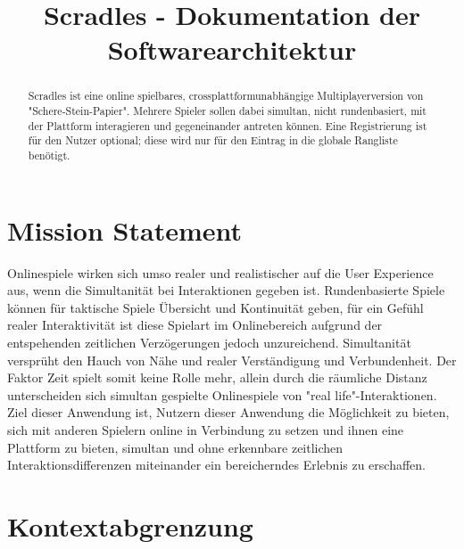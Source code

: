 \documentclass[conference]{IEEEtran}
\title{
Scradles - Dokumentation der Softwarearchitektur
}
\author{\IEEEauthorblockN{Aaron Kreuzer}
\IEEEauthorblockA{
a.kreuzer@oth-aw.de}
\and
\IEEEauthorblockN{Amos Asmerom}
\IEEEauthorblockA{
a.asmerom@oth-aw.de}
\and
\IEEEauthorblockN{Christoph Boni}
\IEEEauthorblockA{
c.boni@oth-aw.de}
\and
\IEEEauthorblockN{Leonard Wöllmer}
\IEEEauthorblockA{
l.woellmer@oth-aw.de}
\and
\IEEEauthorblockN{ Adrian Rall}
\IEEEauthorblockA{
a.rall@oth-aw.de}
\and
\IEEEauthorblockN{ Tahata Djoumsi}
\IEEEauthorblockA{
d.tahata@oth-aw.de}
}
\begin{document}
\maketitle
\thispagestyle{empty}
\pagestyle{empty}


\begin{abstract}

Scradles ist eine online spielbares, crossplattformunabhängige Multiplayerversion von "Schere-Stein-Papier". Mehrere Spieler sollen dabei simultan, nicht rundenbasiert, mit der Plattform interagieren und gegeneinander antreten können. Eine Registrierung ist für den Nutzer optional; diese wird nur für den Eintrag in die globale Rangliste benötigt.

\end{abstract}


\section{Mission Statement}
Onlinespiele wirken sich umso realer und realistischer auf die User Experience aus, wenn die Simultanität bei Interaktionen gegeben ist. Rundenbasierte Spiele können für taktische Spiele Übersicht und Kontinuität geben, für ein Gefühl realer Interaktivität ist diese Spielart im Onlinebereich aufgrund der entspehenden zeitlichen Verzögerungen jedoch unzureichend. Simultanität versprüht den Hauch von Nähe und realer Verständigung und Verbundenheit. Der Faktor Zeit spielt somit keine Rolle mehr, allein durch die räumliche Distanz unterscheiden sich  simultan gespielte Onlinespiele von "real life"-Interaktionen.
Ziel dieser Anwendung ist, Nutzern dieser Anwendung die Möglichkeit zu bieten, sich mit anderen Spielern online in Verbindung zu setzen und ihnen eine Plattform zu bieten, simultan und ohne erkennbare zeitlichen Interaktionsdifferenzen miteinander ein bereicherndes Erlebnis zu erschaffen.


\section{Kontextabgrenzung}
\end{document}

